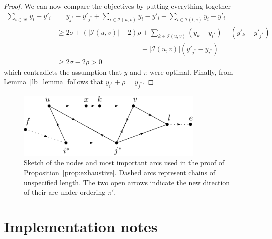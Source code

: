 \documentclass[a4paper]{article}
\theoremstyle{definition}
\theoremstyle{plain}
\begin{document}
\begin{proof}
  We can now compare the objectives by putting everything together
  \begin{align*}
    \sum_{i \in \mathcal{N}} y_{i} - y'_{i} &=  y_{j^{*}} - y'_{j^{*}} + \sum_{i \in \mathcal{I}(u, v)} y_{i} - y'_{i} + \sum_{i \in \mathcal{I}(l, e)} y_{i} - y'_{i} \\
    &\geq 2 \sigma + (|\mathcal{I}(u,v)| - 2) \rho + \sum_{k \in \mathcal{I}(u,v)} (y_{k} - y_{i^{*}}) - (y'_{k} - y'_{j^{*}}) \\ & \hspace{12em} - |\mathcal{I}(u,v)| (y'_{j^{*}} - y_{i^{*}}) \\
    &\geq 2 \sigma - 2 \rho > 0
  \end{align*}
  which contradicts the assumption that $y$ and $\pi$ were optimal.
  Finally, from Lemma~\ref{lb_lemma} follows that $y_{i^{*}} + \rho = y_{j^{*}}$.
\end{proof}

\begin{figure}
  \centering
  \includegraphics[width=0.8\textwidth]{figures/single/platoon-preservation-proof-diagram.pdf}
  \caption{Sketch of the nodes and most important arcs used in the proof of
    Proposition~\ref{prop:exhaustive}. Dashed arcs represent chains of
    unspecified length. The two open arrows indicate the new direction of their
    arc under ordering $\pi'$.}\label{fig:platoon-preservation-diagram}
\end{figure}


\section{Implementation notes}
\end{document}
